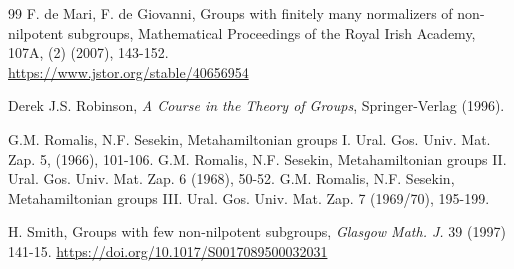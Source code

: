 \documentclass[11pt]{amsart}
\begin{document}
\begin{thebibliography}{99}
 F. de Mari, F. de Giovanni, Groups with finitely many normalizers of non-nilpotent subgroups, Mathematical Proceedings of the Royal Irish Academy, 107A, (2) (2007), 143-152.\\  \href{https://www.jstor.org/stable/40656954}{https://www.jstor.org/stable/40656954}

Derek  J.S. Robinson, \emph{A Course in the Theory of Groups}, Springer-Verlag (1996). 

 G.M. Romalis, N.F. Sesekin, Metahamiltonian groups I. Ural. Gos. Univ. Mat. Zap. 5,  (1966), 101-106.
 G.M. Romalis, N.F. Sesekin, Metahamiltonian groups II. Ural. Gos. Univ. Mat. Zap. 6 (1968), 50-52. 
 G.M. Romalis, N.F. Sesekin,  Metahamiltonian groups III. Ural. Gos. Univ. Mat. Zap. 7 (1969/70), 195-199.

 H. Smith, Groups with  few non-nilpotent subgroups, \emph{Glasgow Math. J.} 39 (1997) 141-15. \href{https://doi.org/10.1017/S0017089500032031}{https://doi.org/10.1017/S0017089500032031}
\end{thebibliography}
\end{document}
